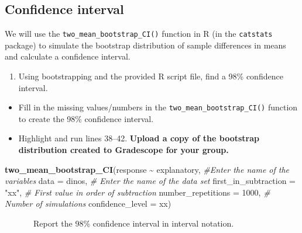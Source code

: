 \documentclass[
]{report}
\newenvironment{Shaded}{\begin{snugshade}}{\end{snugshade}}
\newcommand{\AttributeTok}[1]{\textcolor[rgb]{0.13,0.29,0.53}{#1}}
\newcommand{\CommentTok}[1]{\textcolor[rgb]{0.56,0.35,0.01}{\textit{#1}}}
\newcommand{\DecValTok}[1]{\textcolor[rgb]{0.00,0.00,0.81}{#1}}
\newcommand{\FunctionTok}[1]{\textcolor[rgb]{0.13,0.29,0.53}{\textbf{#1}}}
\newcommand{\NormalTok}[1]{#1}
\newcommand{\SpecialCharTok}[1]{\textcolor[rgb]{0.81,0.36,0.00}{\textbf{#1}}}
\newcommand{\StringTok}[1]{\textcolor[rgb]{0.31,0.60,0.02}{#1}}
\providecommand{\tightlist}{%
  \setlength{\itemsep}{0pt}\setlength{\parskip}{0pt}}
\begin{document}
\vspace{0.8in}

\newpage

\hypertarget{confidence-interval-9}{%
\subsection*{Confidence interval}\label{confidence-interval-9}}

We will use the \texttt{two\_mean\_bootstrap\_CI()} function in R (in the \texttt{catstats} package) to simulate the bootstrap distribution of sample differences in means and calculate a confidence interval.

\begin{enumerate}
\def\labelenumi{\arabic{enumi}.}
\setcounter{enumi}{12}
\tightlist
\item
  Using bootstrapping and the provided R script file, find a 98\% confidence interval.
\end{enumerate}

\begin{itemize}
\item
  Fill in the missing values/numbers in the \texttt{two\_mean\_bootstrap\_CI()} function to create the 98\% confidence interval.
\item
  Highlight and run lines 38--42. \textbf{Upload a copy of the bootstrap distribution created to Gradescope for your group.}
\end{itemize}

\begin{Shaded}
\begin{Highlighting}[]
\FunctionTok{two\_mean\_bootstrap\_CI}\NormalTok{(response }\SpecialCharTok{\textasciitilde{}}\NormalTok{ explanatory, }\CommentTok{\#Enter the name of the variables}
                      \AttributeTok{data =}\NormalTok{ dinos,  }\CommentTok{\# Enter the name of the data set}
                      \AttributeTok{first\_in\_subtraction =} \StringTok{"xx"}\NormalTok{, }\CommentTok{\# First value in order of subtraction}
                      \AttributeTok{number\_repetitions =} \DecValTok{1000}\NormalTok{,  }\CommentTok{\# Number of simulations}
                      \AttributeTok{confidence\_level =}\NormalTok{ xx)}
\end{Highlighting}
\end{Shaded}

~~~~~~~Report the 98\% confidence interval in interval notation.
\end{document}
